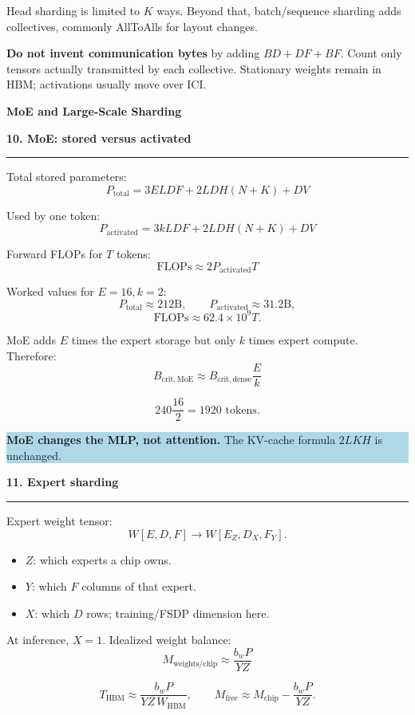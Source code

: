 \documentclass[8pt,a4paper]{extarticle}
\newcommand{\sect}[1]{%
  \vspace{2pt}%
  {\color{DeepBlue}\normalsize\bfseries #1}\par
  \vspace{0.5pt}\hrule\vspace{1.5pt}
}
\newcommand{\formula}[1]{%
  \[
    \boxed{\displaystyle #1}
  \]
}
\newcommand{\callout}[2][LightBlue]{%
  \vspace{1pt}\noindent
  \colorbox{#1}{%
    \parbox{\dimexpr\linewidth-2\fboxsep\relax}{\footnotesize #2}%
  }\vspace{1pt}
}
\begin{document}
\begin{multicols}{2}
Head sharding is limited to $K$ ways. Beyond that, batch/sequence sharding
adds collectives, commonly AllToAlls for layout changes.

\callout[Warm]{%
\textbf{Do not invent communication bytes} by adding $BD+DF+BF$.
Count only tensors actually transmitted by each collective. Stationary
weights remain in HBM; activations usually move over ICI.
}

\end{multicols}

\newpage

\begin{center}
{\color{DeepBlue}\large\bfseries MoE and Large-Scale Sharding}
\end{center}

\begin{multicols}{2}

\sect{10. MoE: stored versus activated}

Total stored parameters:
\formula{
P_{\mathrm{total}}=
3ELDF+2LDH(N+K)+DV
}

Used by one token:
\formula{
P_{\mathrm{activated}}=
3kLDF+2LDH(N+K)+DV
}

Forward FLOPs for $T$ tokens:
\formula{\mathrm{FLOPs}\approx2P_{\mathrm{activated}}T}

Worked values for $E=16,k=2$:
\[
P_{\mathrm{total}}\approx\boxed{212\mathrm{B}},
\qquad
P_{\mathrm{activated}}\approx\boxed{31.2\mathrm{B}},
\]
\[
\mathrm{FLOPs}\approx\boxed{62.4\times10^9T}.
\]

MoE adds $E$ times the expert storage but only $k$ times expert compute.
Therefore:
\formula{
B_{\mathrm{crit,MoE}}
\approx B_{\mathrm{crit,dense}}\frac{E}{k}
}

\[
240\frac{16}{2}=\boxed{1920\text{ tokens}}.
\]

\callout{%
\textbf{MoE changes the MLP, not attention.}
The KV-cache formula $2LKH$ is unchanged.
}

\sect{11. Expert sharding}

Expert weight tensor:
\[
W[E,D,F]\longrightarrow W[E_Z,D_X,F_Y].
\]

\begin{itemize}
  \item $Z$: which experts a chip owns.
  \item $Y$: which $F$ columns of that expert.
  \item $X$: which $D$ rows; training/FSDP dimension here.
\end{itemize}

At inference, $X=1$. Idealized weight balance:
\formula{
M_{\mathrm{weights/chip}}\approx\frac{b_wP}{YZ}
}
\[
T_{\mathrm{HBM}}\approx
\frac{b_wP}{YZ\,W_{\mathrm{HBM}}},
\qquad
M_{\mathrm{free}}\approx
M_{\mathrm{chip}}-\frac{b_wP}{YZ}.
\]


\end{multicols}
\end{document}
